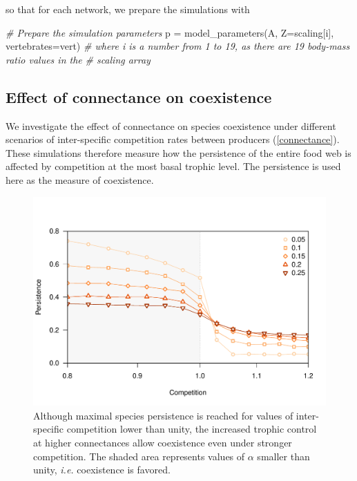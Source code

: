 \documentclass[12pt]{article}
\newenvironment{Shaded}{}{}
\newcommand{\CommentTok}[1]{\textcolor[rgb]{0.38,0.63,0.69}{\textit{{#1}}}}
\newcommand{\NormalTok}[1]{{#1}}
\begin{document}
so that for each network, we prepare the simulations with

\begin{Shaded}
\begin{Highlighting}[]
\CommentTok{# Prepare the simulation parameters}
\NormalTok{p = model_parameters(A,}
      \NormalTok{Z=scaling[i],}
      \NormalTok{vertebrates=vert)}
\CommentTok{# where i is a number from 1 to 19, as there are 19 body-mass ratio values in the}
\CommentTok{# scaling array}
\end{Highlighting}
\end{Shaded}

\subsection{Effect of connectance on
coexistence}\label{effect-of-connectance-on-coexistence}

We investigate the effect of connectance on species coexistence under
different scenarios of inter-specific competition rates between
producers (\autoref{connectance}). These simulations therefore measure
how the persistence of the entire food web is affected by competition at
the most basal trophic level. The persistence is used here as the
measure of coexistence.

\begin{figure}[bt]
    \centering
    \includegraphics[width=\columnwidth]{figures/connectance.pdf}
    \caption[Connectance and competition affect species persistence.]{Although maximal species persistence is reached for values of inter-specific competition lower than unity, the increased trophic control at higher connectances allow coexistence even under stronger competition. The shaded area represents values of $\alpha$ smaller than unity, \emph{i.e.} coexistence is favored.}
    \label{connectance}
\end{figure}
\end{document}
